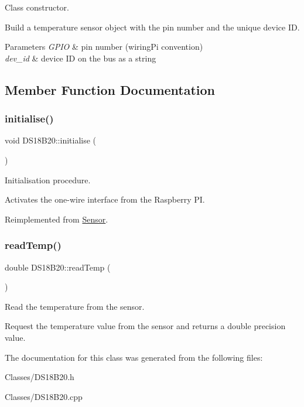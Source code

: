 Class constructor. 

Build a temperature sensor object with the pin number and the unique device ID. 
\begin{DoxyParams}{Parameters}
{\em G\+P\+IO} & pin number (wiring\+Pi convention) \\
\hline
{\em dev\+\_\+id} & device ID on the bus as a string \\
\hline
\end{DoxyParams}


\subsection{Member Function Documentation}
\mbox{\label{classDS18B20_ab244f4c5331b543d5e7d7bda33c54e40}} 
\subsubsection{\texorpdfstring{initialise()}{initialise()}}
{\footnotesize\ttfamily void D\+S18\+B20\+::initialise (\begin{DoxyParamCaption}{ }\end{DoxyParamCaption})\hspace{0.3cm}{\ttfamily [virtual]}}



Initialisation procedure. 

Activates the one-\/wire interface from the Raspberry PI. 

Reimplemented from \mbox{\hyperlink{classSensor_af6f7d509e560240dfc5b1def0d87c26f}{Sensor}}.

\mbox{\label{classDS18B20_a1abd2723b34fdeb9d538476cfac4f042}} 
\subsubsection{\texorpdfstring{read\+Temp()}{readTemp()}}
{\footnotesize\ttfamily double D\+S18\+B20\+::read\+Temp (\begin{DoxyParamCaption}{ }\end{DoxyParamCaption})}



Read the temperature from the sensor. 

Request the temperature value from the sensor and returns a double precision value. 

The documentation for this class was generated from the following files\+:\begin{DoxyCompactItemize}
\item 
Classes/D\+S18\+B20.\+h\item 
Classes/D\+S18\+B20.\+cpp\end{DoxyCompactItemize}

